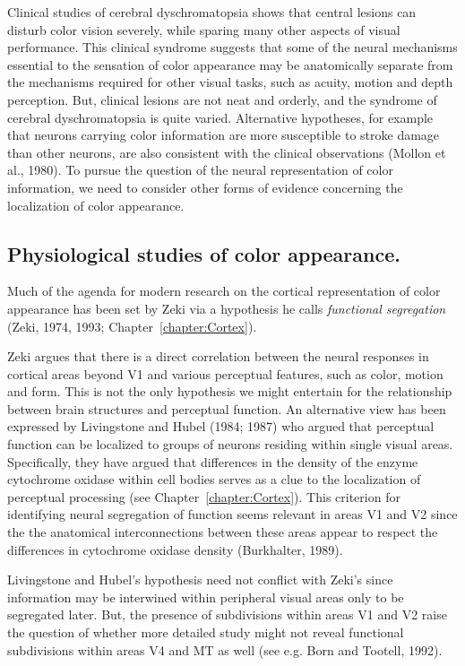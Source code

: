 Clinical studies of cerebral dyschromatopsia shows that central
lesions can disturb color vision severely, while sparing many other
aspects of visual performance.  This clinical syndrome suggests that
some of the neural mechanisms essential to the sensation of color
appearance may be anatomically separate from the mechanisms required
for other visual tasks, such as acuity, motion and depth perception.
But, clinical lesions are not neat and orderly, and the syndrome of
cerebral dyschromatopsia is quite varied.  Alternative hypotheses, for
example that neurons carrying color information are more susceptible
to stroke damage than other neurons, are also consistent with the
clinical observations (Mollon et al., 1980).  To pursue the question
of the neural representation of color information, we need to consider
other forms of evidence concerning the localization of color
appearance.

\subsection*{Physiological studies of color appearance.}
Much of the agenda for modern research on the cortical representation
of color appearance has been set by Zeki via a hypothesis he calls
{\em functional segregation} (Zeki, 1974, 1993;
Chapter~\ref{chapter:Cortex}).

Zeki argues that there is a direct correlation between the neural
responses in cortical areas beyond V1 and various perceptual features,
such as color, motion and form.  This is not the only hypothesis we
might entertain for the relationship between brain structures and
perceptual function.  An alternative view has been expressed by
Livingstone and Hubel (1984; 1987) who argued that perceptual function
can be localized to groups of neurons residing within single visual
areas.  Specifically, they have argued that differences in the density
of the enzyme cytochrome oxidase within cell bodies serves as a clue
to the localization of perceptual processing (see
Chapter~\ref{chapter:Cortex}).  This criterion for identifying neural
segregation of function seems relevant in areas V1 and V2 since the
the anatomical interconnections between these areas appear to respect
the differences in cytochrome oxidase density (Burkhalter, 1989).

Livingstone and Hubel's hypothesis need not conflict with Zeki's since
information may be interwined within peripheral visual areas only to
be segregated later.  But, the presence of subdivisions within areas
V1 and V2 raise the question of whether more detailed study might not
reveal functional subdivisions within areas V4 and MT as well (see
e.g. Born and Tootell, 1992).

